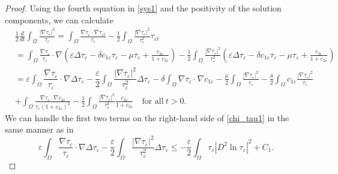 \documentclass[a4paper,10pt]{article}
\theoremstyle{definition}
\begin{document}
\begin{proof}
  Using the fourth equation in \eqref{sys1} and the positivity of the solution components, we can calculate
  \begin{align}
  \label{chi_tau1}
    \nonumber & \frac{1}{2} \frac{d}{dt} \int_\Omega \frac{|\nabla \tau_\varepsilon|^2}{\tau_\varepsilon} = \int_\Omega \frac{\nabla \tau_\varepsilon \cdot \nabla \tau_{\varepsilon t}}{\tau_\varepsilon} - \frac{1}{2} \int_\Omega \frac{|\nabla \tau_\varepsilon|^2}{\tau_\varepsilon^2} \tau_{\varepsilon t}   \\[5pt]
    \nonumber & = \int_\Omega \frac{\nabla \tau_\varepsilon }{\tau_\varepsilon} \cdot \nabla (\varepsilon \Delta \tau_\varepsilon - \delta c_{1\varepsilon}  \tau_\varepsilon - \mu \tau_\varepsilon +  \tfrac{c_{2\varepsilon}}{1 + c_{2\varepsilon}})
   - \frac{1}{2} \int_\Omega \frac{|\nabla \tau_\varepsilon|^2}{\tau_\varepsilon^2} (\varepsilon \Delta \tau_\varepsilon - \delta c_{1\varepsilon}  \tau_\varepsilon - \mu \tau_\varepsilon +  \tfrac{c_{2\varepsilon}}{1 + c_{2\varepsilon}} )   \\[5pt]
   \nonumber & = \varepsilon \int_\Omega \dfrac{\nabla \tau_\varepsilon}{\tau_\varepsilon} \cdot \nabla \Delta \tau_\varepsilon - \dfrac{\varepsilon}{2} \int_\Omega \dfrac{|\nabla \tau_\varepsilon|^2}{\tau_\varepsilon^2} \Delta \tau_\varepsilon - \delta \int_\Omega \nabla \tau_\varepsilon \cdot \nabla c_{1\varepsilon} - \frac{\mu}{2} \int_\Omega \frac{|\nabla \tau_\varepsilon|^2}{\tau_\varepsilon} - \frac{\delta}{2} \int_\Omega c_{1 \varepsilon} \frac{|\nabla \tau_\varepsilon|^2}{\tau_\varepsilon} \\[5pt]
   & + \int_\Omega \frac{\nabla \tau_\varepsilon \cdot \nabla c_{2\varepsilon}}{\tau_\varepsilon (1 + c_{2\varepsilon})^2} - \frac{1}{2} \int_\Omega \frac{|\nabla \tau_\varepsilon|^2}{\tau_\varepsilon^2} \frac{c_{2\varepsilon}}{1 + c_{2\varepsilon}}\quad \text{for all}~ t > 0.
  \end{align}
  We can handle the first two terms on the right-hand side of \eqref{chi_tau1} in the same manner as in \cite[Lemma 4.2, (4.9)-(4.12)]{dai2022global}
  \begin{equation}
    \label{chi_tau2}
    \varepsilon \int_{\Omega} \dfrac{\nabla \tau_\varepsilon}{\tau_\varepsilon} \cdot \nabla \Delta \tau_\varepsilon - \dfrac{\varepsilon}{2} \int_\Omega \dfrac{|\nabla \tau_\varepsilon|^2}{\tau_\varepsilon^2} \Delta \tau_\varepsilon \leq - \frac{\varepsilon}{2} \int_\Omega \tau_\varepsilon |D^2 \ln \tau_\varepsilon|^2 + C_1 .
  \end{equation}

\end{proof}
\end{document}

